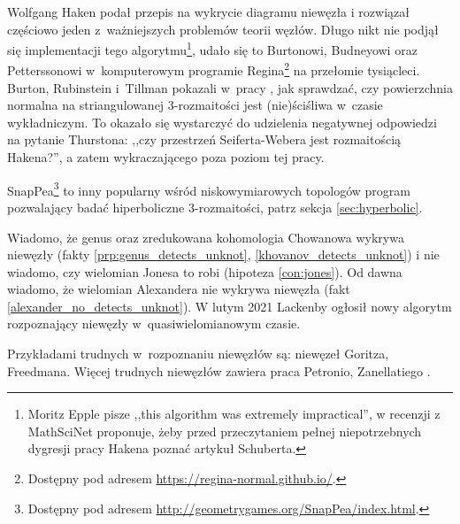 Wolfgang Haken \cite{haken61} podał przepis na wykrycie diagramu niewęzła i rozwiązał częściowo jeden z~ważniejszych problemów teorii węzłów.
%
Długo nikt nie podjął się implementacji tego algorytmu\footnote{Moritz Epple pisze ,,this algorithm was extremely impractical'', w recenzji z MathSciNet proponuje, żeby przed przeczytaniem pełnej niepotrzebnych dygresji pracy Hakena poznać artykuł \cite{schubert61} Schuberta.}, udało się to Burtonowi, Budneyowi oraz Petterssonowi w~komputerowym programie Regina\footnote{Dostępny pod adresem \url{https://regina-normal.github.io/}.} na przełomie tysiącleci.
%
%
%
%
Burton, Rubinstein i~Tillman pokazali w~pracy \cite{burton12}, jak sprawdzać, czy powierzchnia normalna na striangulowanej 3-rozmaitości jest (nie)ściśliwa w~czasie wykładniczym.
%
%
To okazało się wystarczyć do udzielenia negatywnej odpowiedzi na pytanie Thurstona: ,,czy przestrzeń Seiferta-Webera jest rozmaitością Hakena?'', a zatem wykraczającego poza poziom tej pracy.
%
%
%

SnapPea\footnote{Dostępny pod adresem \url{http://geometrygames.org/SnapPea/index.html}.} to inny popularny wśród niskowymiarowych topologów program pozwalający badać hiperboliczne 3-rozmaitości, patrz sekcja \ref{sec:hyperbolic}.

Wiadomo, że genus oraz zredukowana kohomologia Chowanowa wykrywa niewęzły (fakty \ref{prp:genus_detects_unknot}, \ref{khovanov_detects_unknot}) i nie wiadomo, czy wielomian Jonesa to robi (hipoteza \ref{con:jones}).
%
%
%
Od dawna wiadomo, że wielomian Alexandera nie wykrywa niewęzła (fakt \ref{alexander_no_detects_unknot}).
W lutym 2021 Lackenby ogłosił nowy algorytm rozpoznający niewęzły w~quasiwielomianowym czasie.
%

Przykładami trudnych w~rozpoznaniu niewęzłów są: niewęzeł Goritza, Freedmana.
Więcej trudnych niewęzłów zawiera praca Petronio, Zanellatiego \cite{zanellati16}.
%
%

